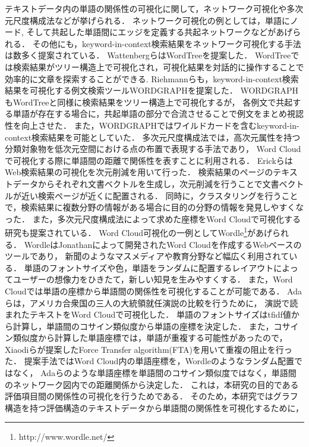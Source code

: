 \documentclass[syuuron]{kuee}
\begin{document}
		テキストデータ内の単語の関係性の可視化に関して，ネットワーク可視化や多次元尺度構成法などが挙げられる．
		ネットワーク可視化の例としては，単語にノード, 
		そして共起した単語間にエッジを定義する共起ネットワークなどがあげられる．
		その他にも，keyword-in-context検索結果をネットワーク可視化する手法は数多く提案されている．
		WattenbergらはWordTreeを提案した\cite{wt1}．
		WordTreeでは検索結果がツリー構造上で可視化され，可視化結果を対話的に操作することで効率的に文章を探索することができる.
		Riehmannらも，keyword-in-context検索結果を可視化する例文検索ツールWORDGRAPHを提案した\cite{wg1}．
		WORDGRAPHもWordTreeと同様に検索結果をツリー構造上で可視化するが，
		各例文で共起する単語が存在する場合に，共起単語の部分で合流させることで例文をまとめ視認性を向上させた．
		また，WORDGRAPHではワイルドカードを含むkeyword-in-context検索結果を可能としていた．		
		多次元尺度構成法では，高次元属性を持つ分類対象物を低次元空間における点の布置で表現する手法であり，
		Word Cloudで可視化する際に単語間の距離で関係性を表すことに利用される\cite{wc2}．
		ErickらはWeb検索結果の可視化を次元削減を用いて行った\cite{or1}．
		検索結果のページのテキストデータからそれぞれ文書ベクトルを生成し，次元削減を行うことで文書ベクトルが近い検索ページが近くに配置される．
		同時に，クラスタリングを行うことで，検索結果に複数分野の情報がある場合に目的の分野の情報を発見しやすくなった．
		また，多次元尺度構成法によって求めた座標をWord Cloudで可視化する研究も提案されている．
		Word Cloud可視化の一例としてWordle\footnote{http://www.wordle.net/}があげられる．
		WordleはJonathanによって開発されたWord Cloudを作成するWebベースのツールであり，
		新聞のようなマスメディアや教育分野など幅広く利用されている\cite{wc2}．
		単語のフォントサイズや色，単語をランダムに配置するレイアウトによってユーザーの想像力をひきたて，新しい知見を生みやすくする．
		また，Word Cloudでは単語の座標から単語間の関係性を可視化することが可能である．
		Adaらは，アメリカ合衆国の三人の大統領就任演説の比較を行うために，
		演説で読まれたテキストをWord Cloudで可視化した\cite{fta2}．
		単語のフォントサイズはtfidf値から計算し，単語間のコサイン類似度から単語の座標を決定した．
		また，コサイン類似度から計算した単語座標では，単語が重複する可能性があったので，
		Xiaodiらが提案したForce Transfer algorithm(FTA)を用いて重複の阻止を行った\cite{fta1}．
		提案手法ではWord Cloud内の単語座標を，Wordleのようなランダム配置ではなく，
		Adaらのような単語座標を単語間のコサイン類似度ではなく，単語間のネットワーク図内での距離関係から決定した．
		これは，本研究の目的である評価項目間の関係性の可視化を行うためである．
		そのため，本研究ではグラフ構造を持つ評価構造のテキストデータから単語間の関係性を可視化するために，
\end{document}
